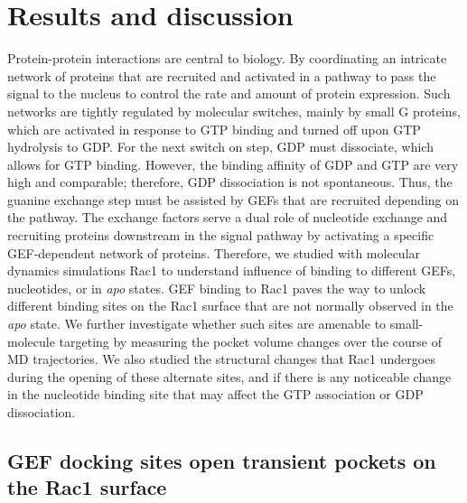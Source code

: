 \documentclass[12pt, a4paper]{achemso}
\begin{document}
\section{Results and discussion}
Protein-protein interactions are central to biology. By coordinating an intricate network of proteins that are recruited and activated in a pathway to pass the signal to the nucleus to control the rate and amount of protein expression. Such networks are tightly regulated by molecular switches, mainly by small G proteins, which are activated in response to GTP binding and turned off upon GTP hydrolysis to GDP. For the next switch on step, GDP must dissociate, which allows for GTP binding. However, the binding affinity of GDP and GTP are very high and comparable; therefore, GDP dissociation is not spontaneous. Thus, the guanine exchange step must be assisted by GEFs that are recruited depending on the pathway. The exchange factors serve a dual role of nucleotide exchange and recruiting proteins downstream in the signal pathway by activating a specific GEF-dependent network of proteins. Therefore, we studied with molecular dynamics simulations Rac1 to understand influence of binding to different GEFs, nucleotides, or in \textit{apo} states. GEF binding to Rac1 paves the way to unlock different binding sites on the Rac1 surface that are not normally observed in the \textit{apo} state. We further investigate whether such sites are amenable to small-molecule targeting by measuring the pocket volume changes over the course of MD trajectories. We also studied the structural changes that Rac1 undergoes during the opening of these alternate sites, and if there is any noticeable change in the nucleotide binding site that may affect the GTP association or GDP dissociation. 

\subsection{GEF docking sites open transient pockets on the Rac1 surface}
\end{document}
